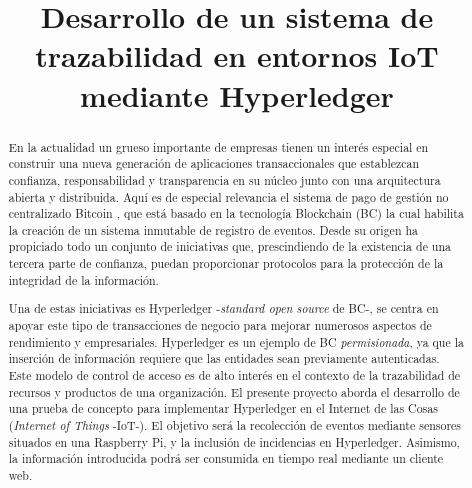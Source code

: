 \documentclass[10pt,conference,a4paper]{IEEEtran}
\begin{document}
\title{Desarrollo de un sistema de trazabilidad en entornos IoT mediante Hyperledger}

\author{
\and
{}
}

\maketitle

\begin{abstract}
    En la actualidad un grueso importante de empresas tienen un
    interés especial en construir una nueva generación de aplicaciones
    transaccionales que establezcan confianza, responsabilidad y
    transparencia en su núcleo junto con una arquitectura abierta y
    distribuida. Aquí es de especial relevancia el sistema de pago de
    gestión no centralizado Bitcoin \cite{JNIC2018_3}, que está basado
    en la tecnología Blockchain (BC) la cual habilita la creación de un
    sistema inmutable de registro de eventos. Desde su origen ha
    propiciado todo un conjunto de iniciativas que, prescindiendo de la
    existencia de una tercera parte de confianza, puedan
    proporcionar protocolos para la protección de la integridad de la
    información.

    Una de estas iniciativas es Hyperledger \cite{JNIC2018_4}
    -\textit{standard open source} de BC-, se centra en apoyar
    este tipo de transacciones de negocio para mejorar numerosos
    aspectos de rendimiento y empresariales. Hyperledger es un ejemplo
    de BC \emph{permisionada}, ya que la inserción de
    información requiere que las entidades sean previamente
    autenticadas. Este modelo de control de acceso es de alto interés
    en el contexto de la trazabilidad de recursos y productos de una
    organización. El presente proyecto aborda el desarrollo de una
    prueba de concepto para implementar Hyperledger en el Internet de
    las Cosas (\emph{Internet of Things} -IoT-). El objetivo será la recolección de eventos mediante
    sensores situados en una Raspberry Pi, y la inclusión de
    incidencias en Hyperledger. Asimismo, la información introducida
    podrá ser consumida en tiempo real mediante un cliente web.
\end{abstract}
\end{document}
